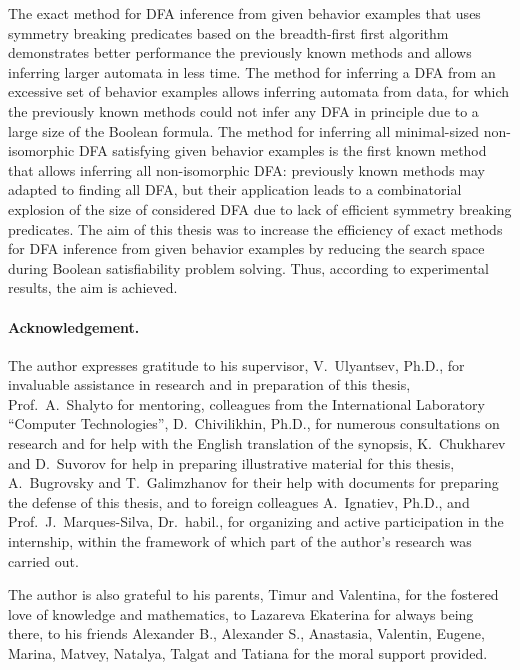 The exact method for DFA inference from given behavior examples that uses symmetry breaking predicates based on 
the breadth-first first algorithm demonstrates better performance the previously known methods and allows inferring
larger automata in less time.
The method for inferring a DFA from an excessive set of behavior examples allows inferring automata from data, for which
the previously known methods could not infer any DFA in principle due to a large size of the Boolean formula.
The method for inferring all minimal-sized non-isomorphic DFA satisfying given behavior examples is the first known
method that allows inferring all non-isomorphic DFA: previously known methods may adapted to finding all DFA, 
but their application leads to a combinatorial explosion of the size of considered DFA due to lack of efficient 
symmetry breaking predicates.
The aim of this thesis was to increase the efficiency of exact methods for DFA inference from given behavior examples by reducing the search space during Boolean satisfiability problem solving.
Thus, according to experimental results, the aim is achieved.


\paragraph*{Acknowledgement.}
The author expresses gratitude to his supervisor, V.~Ulyantsev, Ph.D., for invaluable assistance in research and in preparation of this thesis, Prof.~A.~Shalyto for mentoring, colleagues from the International Laboratory ``Computer Technologies'', D.~Chivilikhin, Ph.D., for numerous consultations on research and for help with the English translation of the synopsis, K.~Chukharev and D.~Suvorov for help in preparing illustrative material for this thesis, A.~Bugrovsky and T.~Galimzhanov for their help with documents for preparing the defense of this thesis, and to foreign colleagues A.~Ignatiev, Ph.D., and Prof.~J.~Marques-Silva, Dr.~habil., for organizing and active participation in the internship, within the framework of which part of the author's research was carried out.

The author is also grateful to his parents, Timur and Valentina, for the fostered love of knowledge and mathematics, to Lazareva Ekaterina for always being there, to his friends Alexander B., Alexander S., Anastasia, Valentin, Eugene, Marina, Matvey, Natalya, Talgat and Tatiana for the moral support provided.